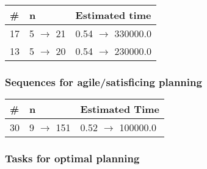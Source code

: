 \documentclass{article}
\begin{document}
                            \begin{center}
                            \begin{tabular}{@{}l|l|l@{}}
                            \# & n & Estimated time\\\midrule
                            17&5 $\rightarrow$ 21&0.54 $\rightarrow$ 330000.0\\
13&5 $\rightarrow$ 20&0.54 $\rightarrow$ 230000.0
                            \end{tabular}
                            \end{center}
                    
                         \subsubsection*{Sequences for agile/satisficing planning}

                        \begin{center}
                        \begin{tabular}{@{}l|l|l@{}}
                        \# & n & Estimated Time\\\midrule
                        30&9 $\rightarrow$ 151&0.52 $\rightarrow$ 100000.0
                        \end{tabular}
                        \end{center}
                    
                                \subsubsection*{Tasks for optimal planning}
                                
\end{document}
